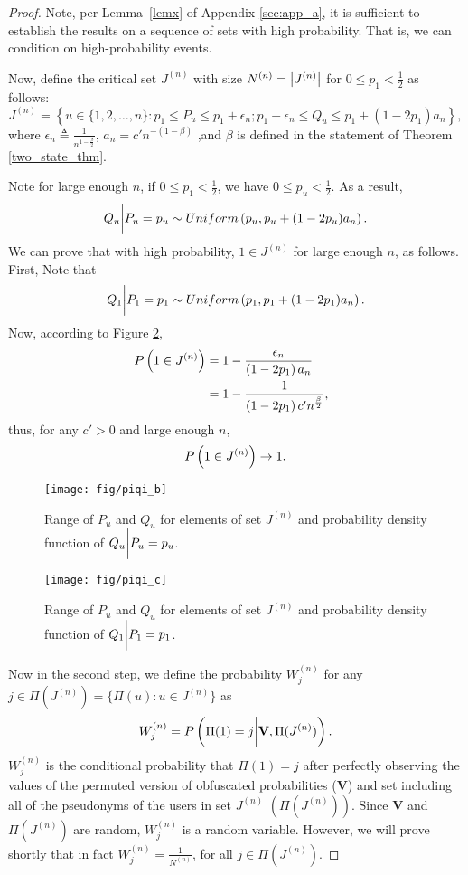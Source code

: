 \begin{proof}
Note, per Lemma~\ref{lemx} of Appendix \ref{sec:app_a}, it is sufficient to establish the results on a sequence of sets with high probability. That is, we can condition on high-probability events.

Now, define the critical set $J^{(n)}$ with size $N^{(n)}=\big{|}J^{(n)}\big{|}$ for $0\leq p_1<\frac{1}{2}$ as follows:
\[J^{(n)}=
\left\{  u \in \{1, 2, \dots, n\}: p_1 \leq P_u\leq p_1+\epsilon_n;  p_1+\epsilon_n\leq Q_u\leq p_1+(1-2p_1)a_n\right\},
\]
where $\epsilon_n \triangleq \frac{1}{n^{1-\frac{\beta}{2}}}$, $a_n= c'n^{-\left(1-\beta\right)}$ ,and $\beta$ is defined in the statement of Theorem \ref{two_state_thm}.


Note for large enough $n$, if $0\leq p_1<\frac{1}{2}$, we have $0\leq p_u<\frac{1}{2}$. As a result,
\[Q_u\bigg{|}P_u=p_u \sim Uniform \left(p_u,p_u+(1-2p_u)a_n\right).\]
We can prove that with high probability, $1 \in J^{(n)}$ for large enough $n$, as follows. First, Note that
\[Q_1\bigg{|}P_1=p_1 \sim Uniform \left(p_1,p_1+(1-2p_1)a_n\right).\]
Now, according to Figure \ref{fig:piqi_c},
	\begin{align}
	\nonumber P\left(1 \in J^{(n)} \right) &= 1- \frac{\epsilon_n}{ \left(1-2p_1 \right)a_n}\\
	\nonumber &= 1- \frac{1}{ \left(1-2p_1 \right)c'n^{\frac{\beta}{2}}}, \ \
	\end{align}
thus, for any $c'>0$ and large enough $n$,
\begin{align}
	\nonumber P\left(1 \in J^{(n)} \right) \to 1.
\end{align}
\begin{figure}[h]
	\centering
	\texttt{[image: fig/piqi\_b]}
	\caption{Range of $P_u$ and $Q_u$ for elements of set $J^{(n)}$ and probability density function of $Q_u\bigg{|}P_u=p_u$.}
	\label{fig:piqi_b}
\end{figure}

\begin{figure}[h]
	\centering
	\texttt{[image: fig/piqi\_c]}
	\caption{Range of $P_u$ and $Q_u$ for elements of set $J^{(n)}$ and probability density function of $Q_1\bigg{|}P_1=p_1$.}
	\label{fig:piqi_c}
\end{figure}




Now in the second step, we define the probability $W_j^{(n)}$ for any $j \in \Pi(J^{(n)})=\{\Pi(u): u \in J^{(n)} \}$ as
\[W_j^{(n)}= P\left(\Pi(1)=j \bigg{|} \textbf{V}, \Pi (J^{(n)})\right).\]
$W_j^{(n)}$ is the conditional probability that $\Pi(1)=j$ after perfectly observing the values of the permuted version of obfuscated probabilities ($\textbf{V}$) and set including all of the pseudonyms of the users in set $J^{(n)}$ $\left(\Pi(J^{(n)})\right)$. Since $\textbf{V}$ and $\Pi (J^{(n)})$ are random, $W_j^{(n)}$ is a random variable. However, we will prove shortly that in fact $W_j^{(n)}=\frac{1}{N^{(n)}}$, for all $j \in \Pi (J^{(n)})$.


\end{proof}
